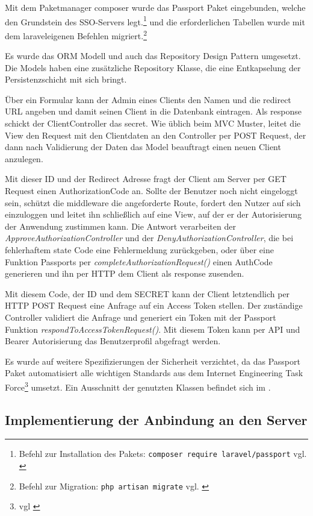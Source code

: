 Mit dem Paketmanager composer wurde das Passport Paket eingebunden, welche den Grundstein des SSO-Servers legt.\footnote{Befehl zur Installation des Pakets: \texttt{composer require laravel/passport} vgl. \cite{composer}} und die erforderlichen Tabellen wurde mit dem laraveleigenen Befehlen migriert.\footnote{Befehl zur Migration: \texttt{php artisan migrate} vgl. \cite{Laravel}}

Es wurde das ORM Modell und auch das Repository Design Pattern umgesetzt. Die Models haben eine zusätzliche  Repository Klasse, die eine Entkapselung der Persistenzschicht mit sich bringt.

Über ein Formular kann der Admin eines Clients den Namen und die redirect URL angeben und damit seinen Client in die Datenbank eintragen. Als response schickt der ClientController das secret.
Wie üblich beim MVC Muster, leitet die View den Request mit den Clientdaten an den Controller per POST Request, der dann nach Validierung der Daten das Model beauftragt einen neuen Client anzulegen. 

Mit dieser ID und der Redirect Adresse fragt der Client am Server per GET Request einen AuthorizationCode an. Sollte der Benutzer noch nicht eingeloggt sein, schützt die middleware die angeforderte Route, fordert den Nutzer auf sich einzuloggen und leitet ihn schließlich auf eine View, auf der er der Autorisierung der Anwendung zustimmen kann. Die Antwort verarbeiten der \textit{ApproveAuthorizationController} und der \textit{DenyAuthorizationController}, die bei fehlerhaftem state Code eine Fehlermeldung zurückgeben, oder über eine Funktion Passports per \textit{completeAuthorizationRequest()} einen AuthCode generieren und ihn per HTTP dem Client als response zusenden.

Mit diesem Code, der ID und dem SECRET kann der Client letztendlich per HTTP POST Request eine Anfrage auf ein Access Token stellen. Der zuständige Controller validiert die Anfrage und generiert ein Token mit der Passport Funktion \textit{respondToAccessTokenRequest()}. Mit diesem Token kann per API und Bearer Autorisierung das Benutzerprofil abgefragt werden.

Es wurde auf weitere Spezifizierungen der Sicherheit verzichtet, da das Passport Paket automatisiert alle wichtigen Standards aus dem Internet Engineering Task Force\footnote{vgl \cite{OAuth2}} umsetzt. Ein Ausschnitt der genutzten Klassen befindet sich im  .

\subsection{Implementierung der Anbindung an den Server}
\label{sec:ImplementierungCient}

